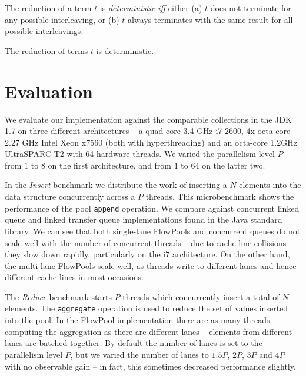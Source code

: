 \documentclass[runningheads,a4paper]{llncs}
\begin{document}
\begin{definition}[Determinism]
The reduction of a term $t$ is \emph{deterministic} \emph{iff} either (a) $t$ does not terminate for any possible interleaving, or (b) $t$ always terminates with the same result for all possible interleavings.
\end{definition}

\begin{theorem}
The reduction of terms $t$ is deterministic.
\end{theorem}


\section{Evaluation}
\label{sec:evaluation}

We evaluate our implementation against the comparable collections in
the JDK 1.7 on three different architectures -- a quad-core 3.4 GHz
i7-2600, 4x octa-core 2.27 GHz Intel Xeon x7560 (both with
hyperthreading) and an octa-core 1.2GHz UltraSPARC T2 with 64 hardware
threads. We varied the parallelism level $P$ from $1$ to $8$ on the first
architecture, and from $1$ to $64$ on the latter two.

In the \textit{Insert} benchmark we distribute the work of inserting a
$N$ elements into the data structure concurrently across a
$P$ threads.
This microbenchmark shows the performance of the pool \verb=append=
operation.
We compare against concurrent linked queue \cite{Michael96} and
linked transfer queue \cite{SchererLS09} implementations found in the
Java standard library.
We can see that both single-lane FlowPools and concurrent queues do
not scale well with the number of concurrent threads -- due to cache
line collisions they slow down rapidly, particularly on the i7
architecture.
On the other hand, the multi-lane FlowPools scale well, as threads
write to different lanes and hence different cache lines in
most occasions.

The \textit{Reduce} benchmark starts $P$ threads which concurrently 
insert a total of $N$ elements. The \verb=aggregate= operation is used
to reduce the set of values inserted into the pool.
In the FlowPool implementation there are as many threads computing the
aggregation as there are different lanes -- elements from different
lanes are batched together.
By default the number of lanes is set to the parallelism level $P$,
but we varied the number of lanes to $1.5 P$, $2P$, $3P$ and $4P$ with
no observable gain -- in fact, this sometimes decreased performance
slightly.
\end{document}
